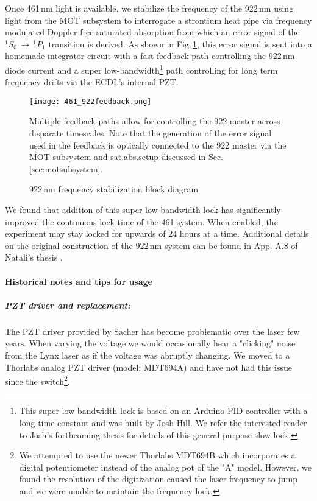 Once 461\,nm light is available, we stabilize the frequency of the 922\,nm using light from the MOT subsystem to interrogate a strontium heat pipe via frequency modulated Doppler-free saturated absorption from which an error signal of the $^1S_0\,\rightarrow\,^1P_1$ transition is derived.
As shown in Fig.\,\ref{fig:922freqLock}, this error signal is sent into a homemade integrator circuit with a fast feedback path controlling the 922\,nm diode current and a super low-bandwidth\footnote{This super low-bandwidth lock is based on an Arduino PID controller with a long time constant and was built by Josh Hill.
We refer the interested reader to Josh's forthcoming thesis for details of this general purpose slow lock.} 
path controlling for long term frequency drifts via the ECDL's internal PZT.
	\begin{figure}
		\centerline{
		\texttt{[image: 461\_922feedback.png]}}
		\caption{922\,nm frequency stabilization block diagram}{Multiple feedback paths allow for controlling the 922 master across disparate timescales. Note that the generation of the error signal used in the feedback is optically connected to the 922 master via the MOT subsystem and sat.\;abs.\;setup discussed in Sec.\,\ref{sec:motsubsystem}.}
		\label{fig:922freqLock}
	\end{figure} 
We found that addition of this super low-bandwidth lock has significantly improved the continuous lock time of the 461 system. 
When enabled, the experiment may stay locked for upwards of 24 hours at a time. 
Additional details on the original construction of the 922\,nm system can be found in App. A.8 of Natali's thesis \cite{MartinezdeEscolar2010}.

\paragraph{Historical notes and tips for usage}
\subparagraph{PZT driver and replacement:}
The PZT driver provided by Sacher has become problematic over the laser few years.
When varying the voltage we would occasionally hear a "clicking" noise from the Lynx laser as if the voltage was abruptly changing.
We moved to a Thorlabs analog PZT driver (model: MDT694A) and have not had this issue since the switch\footnote{We attempted to use the newer Thorlabs MDT694B which incorporates a digital potentiometer instead of the analog pot of the "A" model.
However, we found the resolution of the digitization caused the laser frequency to jump and we were unable to maintain the frequency lock.}.

